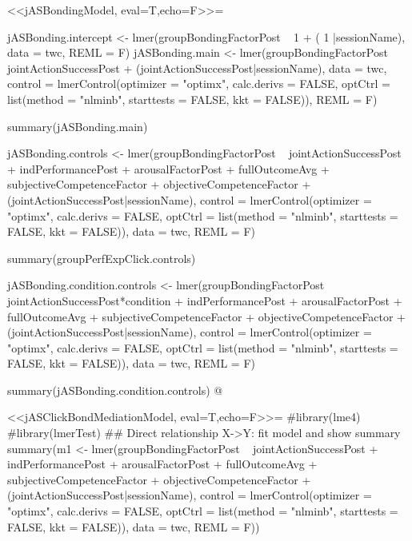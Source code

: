 <<jASBondingModel, eval=T,echo=F>>=

jASBonding.intercept <- lmer(groupBondingFactorPost ~ 1 + ( 1 |sessionName),
                            data = twc,
                            REML = F)
jASBonding.main <- lmer(groupBondingFactorPost ~ jointActionSuccessPost +
                            (jointActionSuccessPost|sessionName),
                            data = twc,
                            control = lmerControl(optimizer = "optimx", calc.derivs = FALSE, optCtrl = list(method = "nlminb", starttests = FALSE, kkt = FALSE)),
                            REML = F)

summary(jASBonding.main)

jASBonding.controls <- lmer(groupBondingFactorPost ~ jointActionSuccessPost +
                            indPerformancePost + arousalFactorPost + fullOutcomeAvg +
                            subjectiveCompetenceFactor + objectiveCompetenceFactor +
                            (jointActionSuccessPost|sessionName),
                            control = lmerControl(optimizer = "optimx", calc.derivs = FALSE, optCtrl = list(method = "nlminb", starttests = FALSE, kkt = FALSE)),
                            data = twc,
                            REML = F)

summary(groupPerfExpClick.controls)

jASBonding.condition.controls <- lmer(groupBondingFactorPost ~
                            jointActionSuccessPost*condition +
                            indPerformancePost + arousalFactorPost + fullOutcomeAvg +
                            subjectiveCompetenceFactor + objectiveCompetenceFactor +
                            (jointActionSuccessPost|sessionName),
                            control = lmerControl(optimizer = "optimx", calc.derivs = FALSE, optCtrl = list(method = "nlminb", starttests = FALSE, kkt = FALSE)),
                            data = twc,
                            REML = F)

summary(jASBonding.condition.controls)
@





<<jASClickBondMediationModel, eval=T,echo=F>>=
#library(lme4)
#library(lmerTest)
## Direct relationship X->Y: fit model and show summary
summary(m1 <- lmer(groupBondingFactorPost ~ jointActionSuccessPost +
                            indPerformancePost + arousalFactorPost + fullOutcomeAvg +
                            subjectiveCompetenceFactor + objectiveCompetenceFactor +
                            (jointActionSuccessPost|sessionName),
                            control = lmerControl(optimizer = "optimx", calc.derivs = FALSE, optCtrl = list(method = "nlminb", starttests = FALSE, kkt = FALSE)),
                            data = twc,
                            REML = F))

